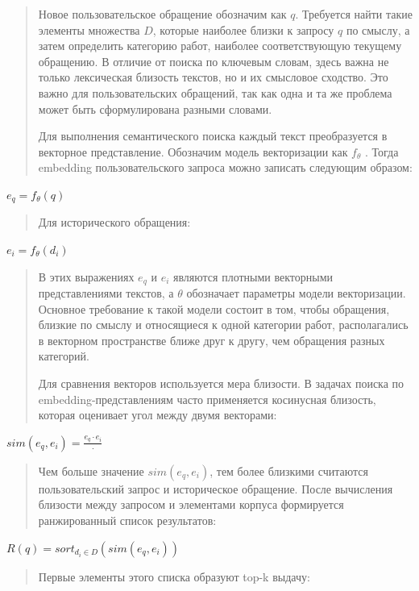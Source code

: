 \begin{quote}
Новое пользовательское обращение обозначим как \(q\). Требуется найти
такие элементы множества \(D\), которые наиболее близки к запросу \(q\)
по смыслу, а затем определить категорию работ, наиболее соответствующую
текущему обращению. В отличие от поиска по ключевым словам, здесь важна
не только лексическая близость текстов, но и их смысловое сходство. Это
важно для пользовательских обращений, так как одна и та же проблема
может быть сформулирована разными словами.

Для выполнения семантического поиска каждый текст преобразуется в
векторное представление. Обозначим модель векторизации как
\(f_{\theta}\) . Тогда embedding пользовательского запроса можно
записать следующим образом:
\end{quote}

\(e_{q} = f_{\theta}(q)\)

\begin{quote}
Для исторического обращения:
\end{quote}

\(e_{i} = f_{\theta}\left( d_{i} \right)\)

\begin{quote}
В этих выражениях \(e_{q}\) и \(e_{i}\) являются плотными векторными
представлениями текстов, а \(\theta\) обозначает параметры модели
векторизации. Основное требование к такой модели состоит в том, чтобы
обращения, близкие по смыслу и относящиеся к одной категории работ,
располагались в векторном пространстве ближе друг к другу, чем обращения
разных категорий.

Для сравнения векторов используется мера близости. В задачах поиска по
embedding-представлениям часто применяется косинусная близость, которая
оценивает угол между двумя векторами:
\end{quote}

\(sim\left( e_{q},e_{i} \right) = \frac{e_{q} \cdot e_{i}}{\cdot}\)

\begin{quote}
Чем больше значение \(sim\left( e_{q},e_{i} \right)\), тем более
близкими считаются пользовательский запрос и историческое обращение.
После вычисления близости между запросом и элементами корпуса
формируется ранжированный список результатов:
\end{quote}

\(R(q) = sort_{d_{i} \in D}\left( sim\left( e_{q},e_{i} \right) \right)\)

\begin{quote}
Первые элементы этого списка образуют top-k выдачу:
\end{quote}

